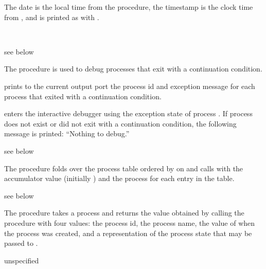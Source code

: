 The date is the local time from the  procedure,
the timestamp is the clock time from , and
 is printed as with .

\begin{procedure}
  \\
\end{procedure}
\returns{} see below

The  procedure is used to debug processes that exit with a
continuation condition.

 prints to the current output port the process id and
exception message for each process that exited with a continuation
condition.

 enters the interactive debugger using the
exception state of process . If process  does not
exist or did not exit with a continuation condition, the following
message is printed: ``Nothing to debug.''

\begin{procedure}
\end{procedure}
\returns{} see below

The  procedure folds over the process table
ordered by  on  and calls 
with the accumulator value (initially ) and the process
for each entry in the table.

\begin{procedure}
\end{procedure}
\returns{} see below

The  procedure takes a process 
and returns the value obtained by calling the procedure 
with four values:
the process id,
the process name,
the value of  when the process was created,
and a representation of the process state
that may be passed to .

\begin{procedure}
\end{procedure}
\returns{} unspecified

